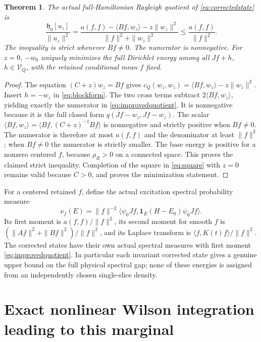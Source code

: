 \documentclass[11pt]{article}
\newtheorem{theorem}{Theorem}
\begin{document}
\begin{theorem}\label{thm:improvedtrial}
The actual full-Hamiltonian Rayleigh quotient of \eqref{eq:correctedstate}
is
\begin{equation}\label{eq:improvedquotient}
 \frac{\mathfrak h_0[u_z]}{\|u_z\|^2}
 =\frac{a(f,f)-\langle Bf,w_z\rangle-z\|w_z\|^2}
        {\|f\|^2+\|w_z\|^2}
 \leq\frac{a(f,f)}{\|f\|^2}.
\end{equation}
The inequality is strict whenever $Bf\ne0$. The numerator is
nonnegative. For $z=0$, $-w_0$ uniquely minimizes the full Dirichlet
energy among all $Jf+h$, $h\in\mathcal V_Q$, with the retained
conditional mean $f$ fixed.
\end{theorem}
\begin{proof}
The equation $(C+z)w_z=Bf$ gives
$c_Q(w_z,w_z)=\langle Bf,w_z\rangle-z\|w_z\|^2$.
Insert $h=-w_z$ in \eqref{eq:blockform}. The two cross terms subtract
$2\langle Bf,w_z\rangle$, yielding exactly the numerator in
\eqref{eq:improvedquotient}. It is nonnegative because it is the full
closed form $q(Jf-w_z,Jf-w_z)$. The scalar
$\langle Bf,w_z\rangle=\langle Bf,(C+z)^{-1}Bf\rangle$ is
nonnegative and strictly positive when $Bf\ne0$. The numerator is
therefore at most $a(f,f)$ and the denominator at least $\|f\|^2$;
when $Bf\ne0$ the numerator is strictly smaller. The base energy is
positive for a nonzero centered $f$, because $\rho_R>0$ on a connected
space. This proves the claimed strict inequality. Completion of the
square in \eqref{eq:square} with $z=0$ remains valid because $C>0$,
and proves the minimization statement.
\end{proof}

For a centered retained $f$, define the actual excitation spectral
probability measure
\[
 \nu_f(E)=\|f\|^{-2}
 \langle\psi_0Jf,\mathbf1_E(H-E_0)\psi_0Jf\rangle.
\]
Its first moment is $a(f,f)/\|f\|^2$, its second moment for smooth
$f$ is $(\|Af\|^2+\|Bf\|^2)/\|f\|^2$, and its Laplace transform
is $\langle f,K(t)f\rangle/\|f\|^2$. The corrected states have their
own actual spectral measures with first moment
\eqref{eq:improvedquotient}. In particular each invariant corrected
state gives a genuine upper bound on the full physical spectral gap;
none of these energies is assigned from an independently chosen
single-slice density.

\section{Exact nonlinear Wilson integration leading to this marginal}
\end{document}
